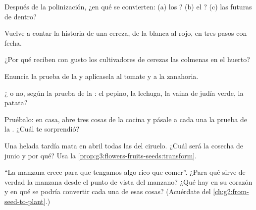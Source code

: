 \begin{exercise}[$\star$]\label{exo:g3:flowers-fruits-seeds:3}
Después de la polinización, ¿en qué se convierten: (a) los ?
(b) el ? (c) las futuras  de dentro?
\end{exercise}

\begin{exercise}[$\star$]\label{exo:g3:flowers-fruits-seeds:4}
Vuelve a contar la historia de una cereza, de la  blanca al 
rojo, en tres pasos con fecha.
\end{exercise}

\begin{exercise}[$\star$]\label{exo:g3:flowers-fruits-seeds:5}
¿Por qué reciben con gusto los cultivadores de cerezas las colmenas en el huerto?
\end{exercise}

\begin{exercise}[$\star$]\label{exo:g3:flowers-fruits-seeds:6}
Enuncia la prueba de la  y aplícasela al tomate y a la zanahoria.
\end{exercise}

\begin{exercise}[$\star$]\label{exo:g3:flowers-fruits-seeds:7}
¿ o no, según la prueba de la : el pepino, la lechuga, la
vaina de judía verde, la patata?
\end{exercise}

\begin{exercise}[$\star$]\label{exo:g3:flowers-fruits-seeds:8}
Pruébalo: en casa, abre tres cosas de la cocina y pásale a cada una la
prueba de la . ¿Cuál te sorprendió?
\end{exercise}

\begin{exercise}[$\star\star$]\label{exo:g3:flowers-fruits-seeds:9}
Una helada tardía mata en abril todas las  del ciruelo. ¿Cuál
será la cosecha de junio y por qué? Usa la
\cref{prop:g3:flowers-fruits-seeds:transform}.
\end{exercise}

\begin{exercise}[$\star\star$]\label{exo:g3:flowers-fruits-seeds:10}
``La manzana crece para que tengamos algo rico que comer''. ¿Para qué
sirve de verdad la manzana desde el punto de vista del manzano? ¿Qué
hay en su corazón y en qué se podría convertir cada una de esas cosas?
(Acuérdate del \cref{ch:g2:from-seed-to-plant}.)
\end{exercise}
